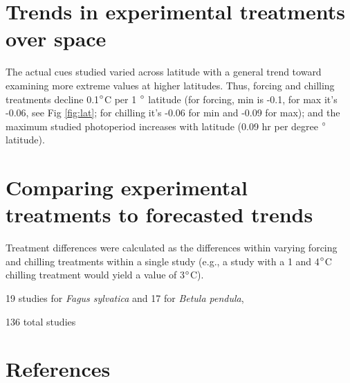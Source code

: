 \documentclass[11pt]{article}
\begin{document}
\section{Trends in experimental treatments over space}


The actual cues studied varied across latitude with a general trend toward examining more extreme values at higher latitudes. Thus, forcing and chilling treatments decline 0.1$\degree$C per 1 $\degree$ latitude (for forcing, min is -0.1, for max it's -0.06, see Fig \ref{fig:lat}; for chilling it's -0.06 for min and -0.09 for max); and the maximum studied photoperiod increases with latitude (0.09 hr per degree $\degree$ latitude). 

\section{Comparing experimental treatments to forecasted trends}

 Treatment differences were calculated as the differences within varying forcing and chilling treatments within a single study (e.g., a study with a 1 and 4$\degree$C chilling treatment would yield a value of 3$\degree$C). 
 
 19 studies for \emph{Fagus sylvatica}  and 17 for \emph{Betula pendula},
 
 136 total studies
 
\newpage
\section{References}


\newpage
\end{document}

